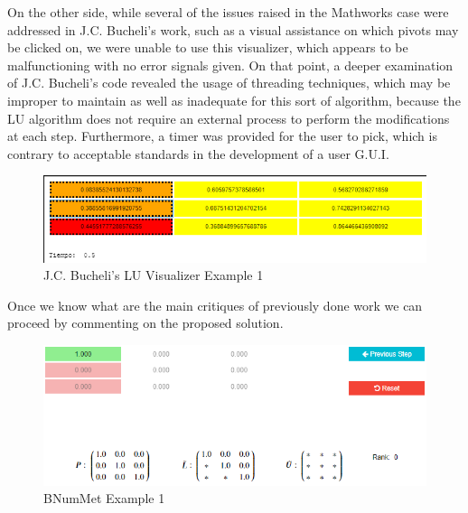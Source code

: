 On the other side, while several of the issues raised in the Mathworks case were addressed in J.C. Bucheli's work, such as a visual assistance on which pivots may be clicked on, we were unable to use this visualizer, which appears to be malfunctioning with no error signals given. On that point, a deeper examination of J.C. Bucheli's code revealed the usage of threading techniques, which may be improper to maintain as well as inadequate for this sort of algorithm, because the LU algorithm does not require an external process to perform the modifications at each step. Furthermore, a timer was provided for the user to pick, which is contrary to acceptable standards in the development of a user G.U.I.

\begin{figure}[H]
    \centering
    \includegraphics[width=\textwidth]{Include/Images/Thesis/Development/Visualizers/LU VISUALIZER/Camilo.LU.Ex1.png}
    \caption{J.C. Bucheli's \cite{bucheli2020} LU Visualizer Example 1}
    \label{fig:J.C. Bucheli's LU Visualizer Example 1}
\end{figure}


Once we know what are the main critiques of previously done work we can proceed by commenting on the proposed solution. 
\begin{figure}[H]
    \centering
    \includegraphics[width=\textwidth]{Include/Images/Thesis/Development/Visualizers/LU VISUALIZER/BNumMet.LU.Ex1.png}
    \caption{BNumMet Example 1}
    \label{fig:BNumMet Example}
\end{figure}

